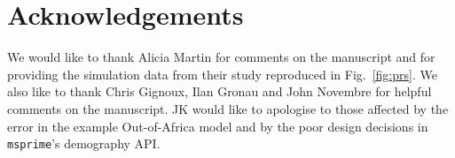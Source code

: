 \documentclass{article}
\newcommand{\msprime}[0]{\texttt{msprime}}
\newcommand{\aprcomment}[1]{{\textcolor{blue}{APR: #1}}}
\begin{document}
\section*{Acknowledgements}
We would like to thank Alicia Martin for comments on the manuscript
and for providing the simulation data from their study reproduced
in Fig.~\ref{fig:prs}. We also like to thank
Chris Gignoux, Ilan Gronau and John Novembre for helpful comments on the manuscript.
JK would like to apologise
to those affected by the error in the example Out-of-Africa model and
by the poor design decisions in \msprime's demography API.





\pagebreak
\end{document}
